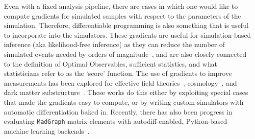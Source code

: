 \documentclass{article}
\begin{document}
Even with a fixed analysis pipeline, there are cases in which one would like to compute gradients for simulated samples with respect to the parameters of the simulation. Therefore, differentiable programming
is also something that is useful to incorporate into the simulators. These gradients are useful for simulation-based inference (aka likelihood-free inference) as they can reduce the number of simulated events needed by orders of magnitude~\cite{Brehmer:2018hga,Cranmer201912789}, and are also closely connected to the definition of Optimal Observables, sufficient statistics, and what statisticians refer to as the `score' function. The use of gradients to improve measurements has been explored for effective field theories~\cite{Brehmer:2018kdj,Brehmer:2018eca}, cosmology~\cite{Alsing:2018eau}, and dark matter substructure~\cite{Brehmer:2019jyt}. These works do this either by exploiting special cases that made the gradients easy to compute, or by writing custom simulators with automatic differentiation baked in. Recently, there has also been progress in evaluating \texttt{MadGraph} matrix elements with autodiff-enabled, Python-based machine learning backends~\cite{diff_ME}.




\end{document}
